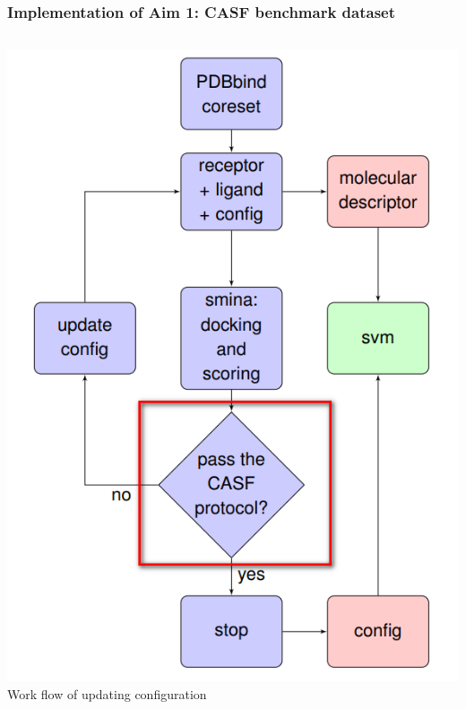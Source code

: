 \begin{frame}
\frametitle{Implementation of Aim 1: CASF benchmark dataset}
   \begin{columns}
       \begin{column}{0.4\textwidth}
        \includegraphics[height=0.8\textheight]{../figures/method_casf.png}\\
      {\scriptsize Work flow of updating configuration}
    \end{column}

\end{columns}
\end{frame}
